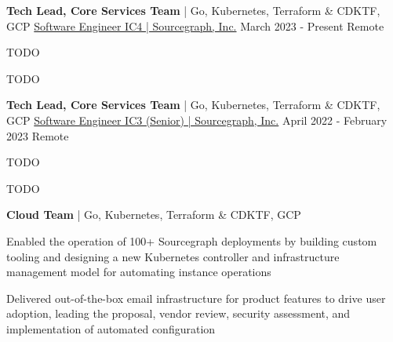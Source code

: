 
\begin{cventries}
  \cventry
    {\textbf{Tech Lead, Core Services Team} | Go, Kubernetes, Terraform \& CDKTF, GCP} %
    {\href{https://bobheadxi.dev/experience/sourcegraph}{Software Engineer IC4 | Sourcegraph, Inc.}} %
    {March 2023 - Present} %
    {Remote} %
    {
        \begin{cvitems}
          \item {TODO}
          \item {TODO}
        \end{cvitems}
    }

  \cventry
    {\textbf{Tech Lead, Core Services Team} | Go, Kubernetes, Terraform \& CDKTF, GCP} %
    {\href{https://bobheadxi.dev/experience/sourcegraph}{Software Engineer IC3 (Senior) | Sourcegraph, Inc.}} %
    {April 2022 - February 2023} %
    {Remote} %
    {
        \begin{cvitems}
          \item {TODO}
        \item {TODO}
        \end{cvitems}
    }

  \cventry
    {\textbf{Cloud Team} | Go, Kubernetes, Terraform \& CDKTF, GCP} %
    {} %
    {} %
    {} %
    {
        \begin{cvitems}
          \item {Enabled the operation of 100+ Sourcegraph deployments by building custom tooling and designing a new Kubernetes controller and infrastructure management model for automating instance operations}
          \item {Delivered out-of-the-box email infrastructure for product features to drive user adoption, leading the proposal, vendor review, security assessment, and implementation of automated configuration}
        \end{cvitems}
    }


\end{cventries}
